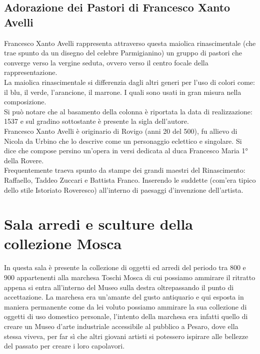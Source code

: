 \documentclass[hidelinks,12pt,a4paper]{article}
\begin{document}
\begin{flushleft}
		\subsection{Adorazione dei Pastori di Francesco Xanto Avelli}
		Francesco Xanto Avelli rappresenta attraverso questa maiolica rinascimentale (che trae spunto da un disegno del celebre Parmigianino) un gruppo di pastori che converge verso la vergine seduta, ovvero verso il centro focale della rappresentazione.\\
		La maiolica rinascimentale si differenzia dagli altri generi per l'uso di colori come: il blu, il verde, l’arancione, il marrone. I quali sono usati in gran misura nella composizione.\\
		Si può notare che al basamento della colonna è riportata la data di realizzazione: 1537 e sul gradino sottostante è presente la sigla dell'autore.\\
		Francesco Xanto Avelli è originario di Rovigo (anni 20 del 500), fu allievo di Nicola da Urbino che lo descrive come un personaggio eclettico e singolare. Si dice che compose persino un’opera in versi dedicata al duca Francesco Maria 1° della Rovere.\\
		Frequentemente traeva spunto da stampe dei grandi maestri del Rinascimento: Raffaello, Taddeo Zuccari e Battista Franco. Inserendo le suddette (com'era tipico dello stile Istoriato Roveresco) all'interno di paesaggi d'invenzione dell'artista.
		
		\section{Sala arredi e sculture della collezione Mosca}
		In questa sala è presente la collezione di oggetti ed arredi del periodo tra 800 e 900 appartenenti alla marchesa  Toschi Mosca di cui possiamo ammirare il ritratto appena si entra all'interno del Museo sulla destra oltrepassando il punto di accettazione. La marchesa era un'amante del gusto antiquario e qui esposta in maniera permanente come da lei voluto possiamo ammirare la sua collezione di oggetti di uso domestico personale, l'intento della marchesa era infatti quello di creare un Museo d'arte industriale accessibile al pubblico a Pesaro, dove ella stessa viveva, per far sì che altri giovani artisti si potessero ispirare alle bellezze del passato per creare i loro capolavori.
		

\end{flushleft}
\end{document}
